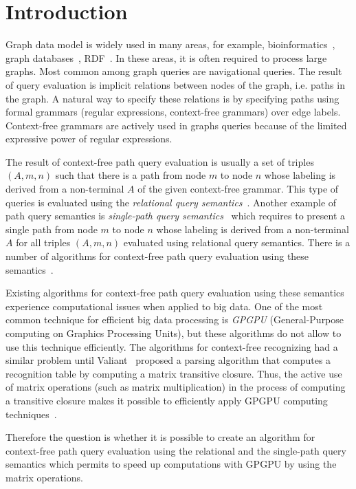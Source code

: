 \section{Introduction}
Graph data model is widely used in many areas, for example, bioinformatics~\cite{Bio}, graph databases~\cite{graphDB}, RDF~\cite{RDF}. In these areas, it is often required to process large graphs. Most common among graph queries are navigational queries. The result of query evaluation is implicit relations between nodes of the graph, i.e. paths in the graph. A natural way to specify these relations is by specifying paths using formal grammars (regular expressions, context-free grammars) over edge labels. Context-free grammars are actively used in graphs queries because of the limited expressive power of regular expressions. 

The result of context-free path query evaluation is usually a set of triples $(A, m, n)$ such that there is a path from node $m$ to node $n$ whose labeling is derived from a non-terminal $A$ of the given context-free grammar. This type of queries is evaluated using the \textit{relational query semantics}~\cite{hellingsRelational}. Another example of path query semantics is \textit{single-path query semantics}~\cite{hellingsPathQuerying} which requires to present a single path from node $m$ to node $n$ whose labeling is derived from a non-terminal $A$ for all triples $(A, m, n)$ evaluated using relational query semantics. There is a number of algorithms for context-free path query evaluation using these semantics~\cite{GLL, hellingsRelational, RDF}.

Existing algorithms for context-free path query evaluation using these semantics experience computational issues when applied to big data. One of the most common technique for efficient big data processing is \textit{GPGPU} (General-Purpose computing on Graphics Processing Units), but these algorithms do not allow to use this technique efficiently. The algorithms for context-free recognizing had a similar problem until Valiant~\cite{valiant} proposed a parsing algorithm that computes a recognition table by computing a matrix transitive closure. Thus, the active use of matrix operations (such as matrix multiplication) in the process of computing a transitive closure makes it possible to efficiently apply GPGPU computing techniques~\cite{matricesOnGPGPU}.

Therefore the question is whether it is possible to create an algorithm for context-free path query evaluation using the relational and the single-path query semantics which permits to speed up computations with GPGPU by using the matrix operations.

